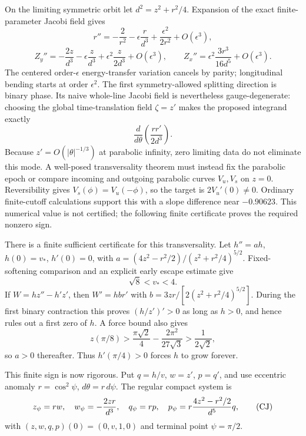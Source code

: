 \documentclass[11pt]{article}
\begin{document}
On the limiting symmetric orbit let $d^2=z^2+r^2/4$. Expansion of the exact
finite-parameter Jacobi field gives
\[
r''=-\frac2{r^2}-\epsilon\frac r{d^3}
+\frac{\epsilon^2}{2r^2}+O(\epsilon^3),
\]
\[
Z_y''=-\frac{2z}{d^3}-\epsilon\frac z{d^3}
+\epsilon^2\frac z{2d^3}+O(\epsilon^3),\qquad
Z_x''=\epsilon^2\frac{3r^3}{16d^5}+O(\epsilon^3).
\tag{FS}
\]
The centered order-$\epsilon$ energy-transfer variation cancels by parity;
longitudinal bending starts at order $\epsilon^2$. The first
symmetry-allowed splitting direction is binary phase. Its naive whole-line
Jacobi field is nevertheless gauge-degenerate: choosing the global
time-translation field $\zeta=z'$ makes the proposed integrand exactly
\[
\frac d{d\theta}\left(\frac{rr'}{2d^3}\right).
\]
Because $z'=O(|\theta|^{-1/3})$ at parabolic infinity, zero limiting data do
not eliminate this mode. A well-posed transversality theorem must instead fix
the parabolic epoch or compare incoming and outgoing parabolic curves
$V_u,V_s$ on $z=0$. Reversibility gives $V_s(\phi)=V_u(-\phi)$, so the target
is $2V_u'(0)\ne0$. Ordinary finite-cutoff calculations support this with a
slope difference near $-0.90623$. This numerical value is not certified;
the following finite certificate proves the required nonzero sign.

There is a finite sufficient certificate for this transversality. Let
$h''=ah$, $h(0)=v_*$, $h'(0)=0$, with
$a=(4z^2-r^2/2)/(z^2+r^2/4)^{5/2}$. Fixed-softening comparison and an explicit
early escape estimate give
\[
\sqrt8<v_*<4.
\]
If $W=hz''-h'z'$, then
$W'=hbr'$ with $b=3zr/[2(z^2+r^2/4)^{5/2}]$. During the first binary
contraction this proves $(h/z')'>0$ as long as $h>0$, and hence rules out a
first zero of $h$. A force bound also gives
\[
z(\pi/8)>
\frac{\pi\sqrt2}{4}-\frac{2\pi^2}{27\sqrt3}>\frac1{2\sqrt2},
\]
so $a>0$ thereafter. Thus $h'(\pi/4)>0$ forces $h$ to grow forever.

This finite sign is now rigorous. Put $q=h/v$, $w=z'$, $p=q'$, and use
eccentric anomaly $r=\cos^2\psi$, $d\theta=r\,d\psi$. The regular compact
system is
\[
z_\psi=rw,\quad w_\psi=-{2zr\over d^3},\quad
q_\psi=rp,\quad
p_\psi=r{4z^2-r^2/2\over d^5}q,
\tag{CJ}
\]
with $(z,w,q,p)(0)=(0,v,1,0)$ and terminal point $\psi=\pi/2$.
\end{document}
